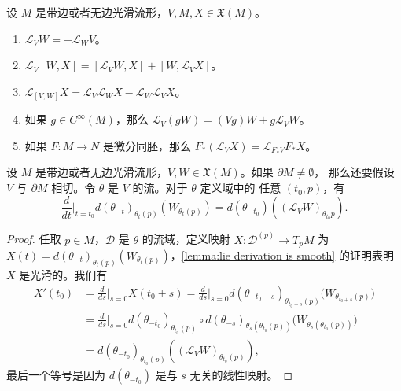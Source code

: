 \begin{corollary}
  设 $M$ 是带边或者无边光滑流形，$V,M,X\in\mathfrak X(M)$。
  \begin{enumerate}
    \item $\mathcal L_VW=-\mathcal L_WV$。
    \item $\mathcal L_V[W,X]=[\mathcal L_VW,X]+[W,\mathcal L_VX]$。
    \item $\mathcal L_{[V,W]}X=\mathcal L_V\mathcal L_WX-\mathcal L_W\mathcal L_VX$。
    \item 如果 $g\in C^\infty(M)$，那么 $\mathcal L_V(gW)=(Vg)W+g\mathcal L_VW$。
    \item 如果 $F:M\to N$ 是微分同胚，那么 $F_*(\mathcal L_VX)=\mathcal L_{F_*V}F_*X$。
  \end{enumerate}
\end{corollary}

\begin{proposition}
  设 $M$ 是带边或者无边光滑流形，$V,W\in\mathfrak X(M)$。如果 $\partial M\neq\emptyset$，
  那么还要假设 $V$ 与 $\partial M$ 相切。令 $\theta$ 是 $V$ 的流。对于 $\theta$ 定义域中的
  任意 $(t_0,p)$，有
  \begin{equation}
    \frac{d}{dt}\bigg|_{t=t_0}d(\theta_{-t})_{\theta_t(p)}(W_{\theta_t(p)})
    =d(\theta_{-t_0})\left((\mathcal L_VW)_{\theta_{t_0}p}\right).
  \end{equation}
\end{proposition}
\begin{proof}
  任取 $p\in M$，$\mathcal D$ 是 $\theta$ 的流域，定义映射 $X:\mathcal D^{(p)}\to T_pM$ 为 
  $X(t)=d(\theta_{-t})_{\theta_t(p)}(W_{\theta_t(p)})$，\autoref{lemma:lie derivation is smooth}
  的证明表明 $X$ 是光滑的。我们有
  \begin{align*}
    X'(t_0)&=\frac{d}{ds}\bigg|_{s=0}X(t_0+s)=\frac{d}{ds}\bigg|_{s=0}
    d(\theta_{-t_0-s})_{\theta_{t_0+s}(p)}\bigl(W_{\theta_{t_0+s}(p)}\bigr)\\
    &=\frac{d}{ds}\bigg|_{s=0}
    d(\theta_{-t_0})_{\theta_{t_0}(p)}\circ d(\theta_{-s})_{\theta_s(\theta_{t_0}(p))}\bigl(W_{\theta_s(\theta_{t_0}(p))}\bigr)\\
    &=d(\theta_{-t_0})_{\theta_{t_0}(p)}\left((\mathcal L_VW)_{\theta_{t_0}(p)}\right),
  \end{align*}
  最后一个等号是因为 $d(\theta_{-t_0})$ 是与 $s$ 无关的线性映射。
\end{proof}








